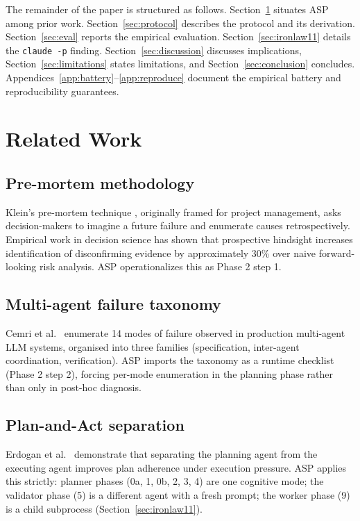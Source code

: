 \documentclass[11pt, a4paper]{article}
\begin{document}
The remainder of the paper is structured as follows. Section~\ref{sec:related} situates ASP among prior work. Section~\ref{sec:protocol} describes the protocol and its derivation. Section~\ref{sec:eval} reports the empirical evaluation. Section~\ref{sec:ironlaw11} details the \texttt{claude -p} finding. Section~\ref{sec:discussion} discusses implications, Section~\ref{sec:limitations} states limitations, and Section~\ref{sec:conclusion} concludes. Appendices~\ref{app:battery}–\ref{app:reproduce} document the empirical battery and reproducibility guarantees.

\section{Related Work}
\label{sec:related}

\subsection{Pre-mortem methodology}
Klein's pre-mortem technique \citep{klein2007premortem}, originally framed for project management, asks decision-makers to imagine a future failure and enumerate causes retrospectively. Empirical work in decision science has shown that prospective hindsight increases identification of disconfirming evidence by approximately 30\% over naive forward-looking risk analysis. ASP operationalizes this as Phase 2 step 1.

\subsection{Multi-agent failure taxonomy}
Cemri et al.~\citep{cemri2025mast} enumerate 14 modes of failure observed in production multi-agent LLM systems, organised into three families (specification, inter-agent coordination, verification). ASP imports the taxonomy as a runtime checklist (Phase 2 step 2), forcing per-mode enumeration in the planning phase rather than only in post-hoc diagnosis.

\subsection{Plan-and-Act separation}
Erdogan et al.~\citep{erdogan2025planandact} demonstrate that separating the planning agent from the executing agent improves plan adherence under execution pressure. ASP applies this strictly: planner phases (0a, 1, 0b, 2, 3, 4) are one cognitive mode; the validator phase (5) is a different agent with a fresh prompt; the worker phase (9) is a child subprocess (Section~\ref{sec:ironlaw11}).
\end{document}
